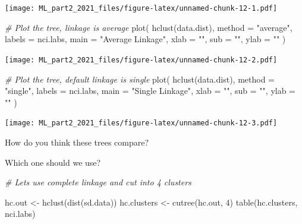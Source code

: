 \documentclass[
]{article}
\newenvironment{Shaded}{\begin{snugshade}}{\end{snugshade}}
\newcommand{\AttributeTok}[1]{\textcolor[rgb]{0.77,0.63,0.00}{#1}}
\newcommand{\CommentTok}[1]{\textcolor[rgb]{0.56,0.35,0.01}{\textit{#1}}}
\newcommand{\DecValTok}[1]{\textcolor[rgb]{0.00,0.00,0.81}{#1}}
\newcommand{\FunctionTok}[1]{\textcolor[rgb]{0.00,0.00,0.00}{#1}}
\newcommand{\NormalTok}[1]{#1}
\newcommand{\OtherTok}[1]{\textcolor[rgb]{0.56,0.35,0.01}{#1}}
\newcommand{\StringTok}[1]{\textcolor[rgb]{0.31,0.60,0.02}{#1}}
\begin{document}
\texttt{[image: ML\_part2\_2021\_files/figure-latex/unnamed-chunk-12-1.pdf]}

\begin{Shaded}
\begin{Highlighting}[]
\CommentTok{\# Plot the tree, linkage is \textquotesingle{}average\textquotesingle{}}
\FunctionTok{plot}\NormalTok{(}
  \FunctionTok{hclust}\NormalTok{(data.dist),}
  \AttributeTok{method =} \StringTok{"average"}\NormalTok{,}
  \AttributeTok{labels =}\NormalTok{ nci.labs,}
  \AttributeTok{main =} \StringTok{"Average Linkage"}\NormalTok{,}
  \AttributeTok{xlab =} \StringTok{""}\NormalTok{,}
  \AttributeTok{sub =} \StringTok{""}\NormalTok{,}
  \AttributeTok{ylab =} \StringTok{""}
\NormalTok{)}
\end{Highlighting}
\end{Shaded}

\texttt{[image: ML\_part2\_2021\_files/figure-latex/unnamed-chunk-12-2.pdf]}

\begin{Shaded}
\begin{Highlighting}[]
\CommentTok{\# Plot the tree, default linkage is \textquotesingle{}single\textquotesingle{}}
\FunctionTok{plot}\NormalTok{(}
  \FunctionTok{hclust}\NormalTok{(data.dist),}
  \AttributeTok{method =} \StringTok{"single"}\NormalTok{,}
  \AttributeTok{labels =}\NormalTok{ nci.labs,}
  \AttributeTok{main =} \StringTok{"Single Linkage"}\NormalTok{,}
  \AttributeTok{xlab =} \StringTok{""}\NormalTok{,}
  \AttributeTok{sub =} \StringTok{""}\NormalTok{,}
  \AttributeTok{ylab =} \StringTok{""}
\NormalTok{)}
\end{Highlighting}
\end{Shaded}

\texttt{[image: ML\_part2\_2021\_files/figure-latex/unnamed-chunk-12-3.pdf]}

How do you think these trees compare?

Which one should we use?

\begin{Shaded}
\begin{Highlighting}[]
\CommentTok{\# Let\textquotesingle{}s use complete linkage and cut into 4 clusters}

\NormalTok{hc.out }\OtherTok{\textless{}{-}} \FunctionTok{hclust}\NormalTok{(}\FunctionTok{dist}\NormalTok{(sd.data))}
\NormalTok{hc.clusters }\OtherTok{\textless{}{-}} \FunctionTok{cutree}\NormalTok{(hc.out, }\DecValTok{4}\NormalTok{)}
\FunctionTok{table}\NormalTok{(hc.clusters, nci.labs)}
\end{Highlighting}
\end{Shaded}
\end{document}
